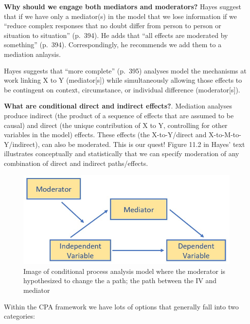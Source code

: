 \documentclass[
  11pt,
]{book}
\begin{document}
\textbf{Why should we engage both mediators and moderators?} Hayes \citeyearpar{hayes_introduction_2018} suggest that if we have only a mediator(s) in the model that we lose information if we ``reduce complex responses that no doubt differ from person to person or situation to situation'' (p.~394). He adds that ``all effects are moderated by something'' (p.~394). Correspondingly, he recommends we add them to a mediation anlaysis.

Hayes \citeyearpar{hayes_introduction_2018} suggests that ``more complete'' (p.~395) analyses model the mechanisms at work linking X to Y (mediator{[}s{]}) while simultaneously allowing those effects to be contingent on context, circumstance, or individual difference (moderator{[}s{]}).

\textbf{What are conditional direct and indirect effects?}. Mediation analyses produce indirect (the product of a sequence of effects that are assumed to be causal) and direct (the unique contribution of X to Y, controlling for other variables in the model) effects. These effects (the X-to-Y/direct and X-to-M-to-Y/indirect), can also be moderated. This is our quest! Figure 11.2 in Hayes' text \citeyearpar{hayes_introduction_2018} illustrates conceptually and statistically that we can specify moderation of any combination of direct and indirect paths/effects.

\begin{figure}
\centering
\includegraphics{images/SimpleMed/CPAmodel.jpg}
\caption{Image of conditional process analysis model where the moderator is hypothesized to change the a path; the path between the IV and mediator}
\end{figure}

Within the CPA framework we have lots of options that generally fall into two categories:
\end{document}

